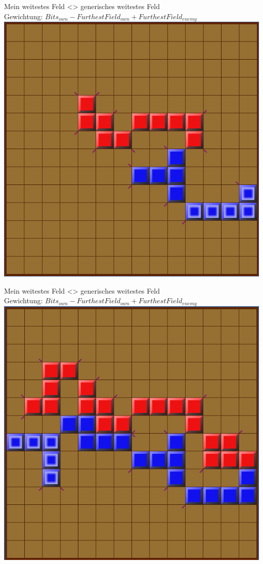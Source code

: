 \documentclass[12pt, draft]{beamer}
\begin{document}
\begin{frame}
	Mein weitestes Feld <> generisches weitestes Feld\\
	\pause
	Gewichtung: $Bits_{own} - FurthestField_{own} + FurthestField_{enemy}$\\
	\pause
	\includegraphics[width=0.6\linewidth]{media/wgh13.png}
\end{frame}
\begin{frame}
	Mein weitestes Feld <> generisches weitestes Feld\\
	Gewichtung: $Bits_{own} - FurthestField_{own} + FurthestField_{enemy}$\\
	\includegraphics[width=0.6\linewidth]{media/wgh14.png}
\end{frame}
\end{document}
